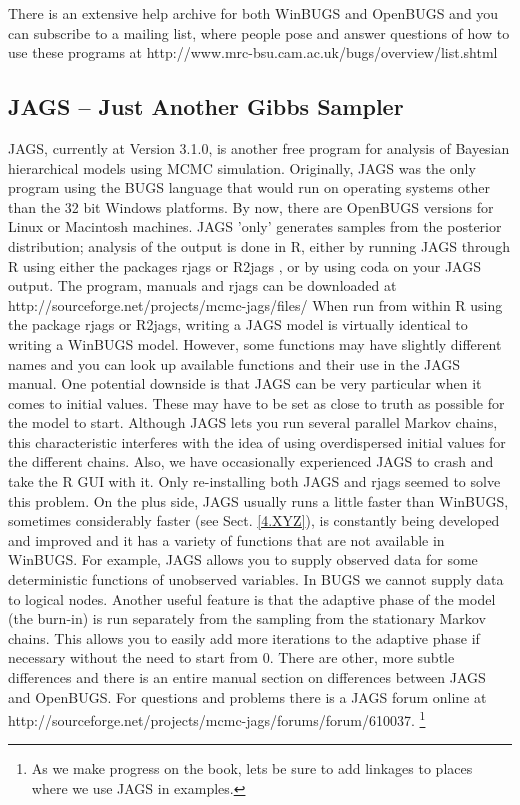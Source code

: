 There is an extensive help archive for both WinBUGS and OpenBUGS and you can subscribe to a mailing list, where people pose and answer questions of how to use these programs at http://www.mrc-bsu.cam.ac.uk/bugs/overview/list.shtml

\subsection{JAGS -- Just Another Gibbs Sampler}
JAGS, currently at Version 3.1.0, is another free program for analysis of Bayesian hierarchical models using MCMC simulation. Originally, JAGS was the only program using the BUGS language that would run on operating systems other than the 32 bit Windows platforms. By now, there are OpenBUGS versions for Linux or Macintosh machines.
JAGS 'only' generates samples from the posterior distribution; analysis of the output is done in R, either by running JAGS through R using either the packages rjags \citep{plummer:2011} or R2jags \citep{su_yajima:2011}, or by using coda on your JAGS output. The program, manuals and rjags can be downloaded at http://sourceforge.net/projects/mcmc-jags/files/
When run from within R using the package rjags or R2jags, writing a JAGS model is virtually identical to writing a WinBUGS model. However, some functions may have slightly different names and you can look up available functions and their use in the JAGS manual. One potential downside is that JAGS can be very particular when it comes to initial values. These may have to be set as close to truth as possible for the model to start. Although JAGS lets you run several parallel Markov chains, this characteristic interferes with the idea of using overdispersed initial values for the different chains. Also, we have occasionally experienced JAGS to crash and take the R GUI with it. Only re-installing both JAGS and rjags seemed to solve this problem.
On the plus side, JAGS usually runs a little faster than WinBUGS, sometimes considerably faster (see Sect. \ref {4.XYZ}), is constantly being developed and improved and it has a variety of functions that are not available in WinBUGS. For example, JAGS allows you to supply observed data for some deterministic functions of unobserved variables. In BUGS we cannot supply data to logical nodes. Another useful feature is that the adaptive phase of the model (the burn-in) is run separately from the sampling from the stationary Markov chains. This allows you to easily add more iterations to the adaptive phase if necessary without the need to start from 0. There are other, more subtle differences and there is an entire manual section on differences between JAGS and OpenBUGS.
For questions and problems there is a JAGS forum online at http://sourceforge.net/projects/mcmc-jags/forums/forum/610037.
\footnote{As we make progress on the book, lets be sure  to add linkages to places where we use JAGS in examples.}

